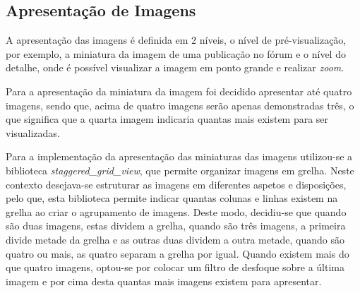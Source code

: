 \subsection{Apresentação de Imagens}
A apresentação das imagens é definida em 2 níveis, o nível de pré-visualização, por exemplo, a miniatura da imagem de uma publicação no fórum e o nível do detalhe, onde é possível visualizar a imagem em ponto grande e realizar \textit{zoom}.

Para a apresentação da miniatura da imagem foi decidido apresentar até quatro imagens, sendo que, acima de quatro imagens serão apenas demonstradas três, o que significa que a quarta imagem indicaria quantas mais existem para ser visualizadas. 

Para a implementação da apresentação das miniaturas das imagens utilizou-se a biblioteca \textit{staggered\_grid\_view}, que permite organizar imagens em grelha. Neste contexto desejava-se estruturar as imagens em diferentes aspetos e disposições, pelo que, esta biblioteca permite indicar quantas colunas e linhas existem na grelha ao criar o agrupamento de imagens. Deste modo, decidiu-se que quando são duas imagens, estas dividem a grelha, quando são três imagens, a primeira divide metade da grelha e as outras duas dividem a outra metade, quando são quatro ou mais, as quatro separam a grelha por igual. Quando existem mais do que quatro imagens, optou-se por colocar um filtro de desfoque sobre a última imagem e por cima desta quantas mais imagens existem para apresentar.

